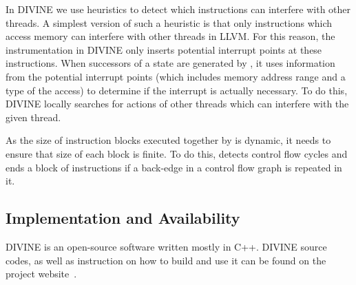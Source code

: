 In DIVINE we use heuristics to detect which instructions can interfere with
other threads.
A simplest version of such a heuristic is that only instructions which access
memory can interfere with other threads in LLVM.
For this reason, the instrumentation in DIVINE only inserts potential interrupt
points at these instructions.
When successors of a state are generated by \divm, it uses information from the
potential interrupt points (which includes memory address range and a type of
the access) to determine if the interrupt is actually necessary.
To do this, DIVINE locally searches for actions of other threads which can
interfere with the given thread.

As the size of instruction blocks executed together by \divm is dynamic, it
needs to ensure that size of each block is finite.
To do this, \divm detects control flow cycles and ends a block of instructions
if a back-edge in a control flow graph is repeated in it.

\subsection{Implementation and Availability}

DIVINE is an open-source software written mostly in C++.
DIVINE source codes, as well as instruction on how to build and use it can be found on the project website~.



